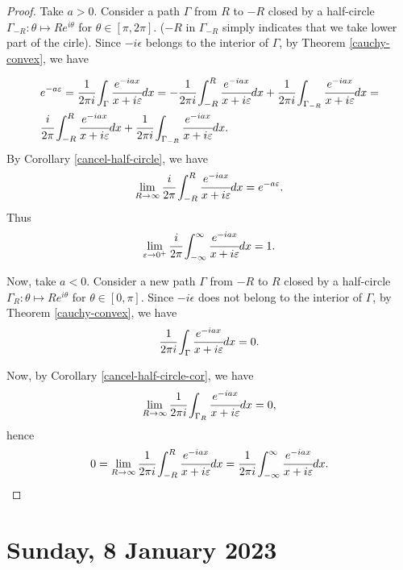 \documentclass[main.tex]{subfiles}
\begin{document}
\begin{proof}
Take $a > 0$. Consider a path $\Gamma$ from $R$ to $-R$ closed by a half-circle $\Gamma_{-R}: \theta \mapsto Re^{i\theta}$ for $\theta\in[\pi, 2\pi]$. ($-R$ in $\Gamma_{-R}$ simply indicates that we take lower part of the cirle). Since $-i\epsilon$ belongs to the interior of $\Gamma$, by Theorem \ref{cauchy-convex}, we have


\begin{align*}
& e^{-a\epsilon} = \cfrac{1}{2\pi i} \int_\Gamma \cfrac{e^{-iax}}{x + i\epsilon} dx =
- \cfrac{1}{2\pi i} \int_{-R}^R \cfrac{e^{-iax}}{x + i\epsilon} dx + 
\cfrac{1}{2\pi i} \int_{\Gamma_{-R}} \cfrac{e^{-iax}}{x + i\epsilon} dx = \\
& \cfrac{i}{2\pi} \int_{-R}^R \cfrac{e^{-iax}}{x + i\epsilon} dx + 
\cfrac{1}{2\pi i} \int_{\Gamma_{-R}} \cfrac{e^{-iax}}{x + i\epsilon} dx.
\end{align*}
By Corollary \ref{cancel-half-circle}, we have
\begin{equation}
\lim_{R\to \infty} \cfrac{i}{2\pi} \int_{-R}^R \cfrac{e^{-iax}}{x + i\epsilon} dx = e^{-a\epsilon}.
\end{equation}
Thus
\begin{equation}
\lim\limits_{\epsilon\to 0^+} \cfrac{i}{2\pi} \int_{-\infty}^\infty  \cfrac{e^{-iax}}{x + i\epsilon} dx = 1.
\end{equation}

Now, take $a < 0$. Consider a new path $\Gamma$ from $-R$ to $R$ closed by a half-circle $\Gamma_{R}: \theta \mapsto Re^{i\theta}$ for $\theta\in[0, \pi]$. Since $-i\epsilon$ does not belong to the interior of $\Gamma$, by Theorem \ref{cauchy-convex}, we have
\begin{equation}
\cfrac{1}{2\pi i} \int_\Gamma \cfrac{e^{-iax}}{x + i\epsilon} dx = 0.
\end{equation}

Now, by Corollary \ref{cancel-half-circle-cor}, we have 
\begin{equation}
\lim_{R\to \infty} \cfrac{1}{2\pi i} \int_{\Gamma_{R}} \cfrac{e^{-iax}}{x + i\epsilon} dx = 0,
\end{equation}
hence
\begin{equation}
0 = \lim_{R\to \infty}\cfrac{1}{2\pi i} \int_{-R}^R \cfrac{e^{-iax}}{x + i\epsilon} dx = 
\cfrac{1}{2\pi i} \int_{-\infty}^\infty  \cfrac{e^{-iax}}{x + i\epsilon} dx.
\end{equation}
\end{proof}

\section{Sunday, 8 January 2023}
\end{document}

